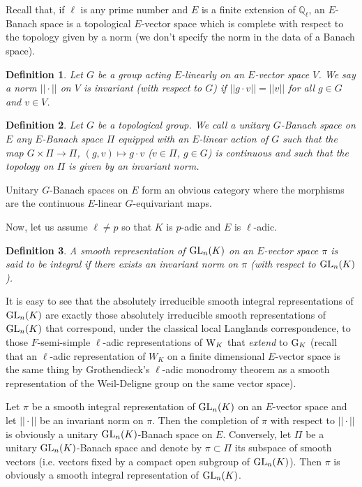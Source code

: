 \documentclass[11pt]{amsart}
\newtheorem{definit}{\bf{Definition}}[subsection]
\begin{document}
Recall that, if $\ell$ is any prime number and $E$ is a finite
extension of ${\mathbb Q}_{\ell}$, an $E$-Banach space is a
topological $E$-vector space which is complete with respect to the
topology given by a norm (we don't specify the norm in the data of a
Banach space). 
 
\begin{definit} 
Let $G$ be a group acting $E$-linearly on an $E$-vector space $V$. We
say a norm $|\!|\cdot|\!|$ on $V$ is invariant (with respect to $G$)
if $|\!|g\cdot v|\!|=|\!|v|\!|$ for all $g\in G$ and $v\in V$. 
\end{definit} 

\begin{definit} 
Let $G$ be a topological group. We call a unitary $G$-Banach space on
$E$ any $E$-Banach space $\Pi$ equipped with an $E$-linear action of
$G$ such that the map $G\times \Pi\rightarrow \Pi$, $(g,v)\mapsto g\cdot v$
($v\in\Pi$, $g\in G$) is continuous and such that the topology on $\Pi$ is
given by an invariant norm. 
\end{definit} 
 
Unitary $G$-Banach spaces on $E$ form an obvious category where the
morphisms are the continuous $E$-linear $G$-equivariant maps.
 
Now, let us assume $\ell\ne p$ so that $K$ is $p$-adic and $E$ is
$\ell$-adic. 

\begin{definit} 
A smooth representation of ${\rm GL}_n(K)$ on an $E$-vector space
$\pi$ is said to be integral if there exists an invariant norm on
$\pi$ (with respect to ${\rm GL}_n(K)$). 
\end{definit} 
 
It is easy to see that the absolutely irreducible smooth integral
representations of ${\rm GL}_n(K)$ are exactly those absolutely
irreducible smooth representations of ${\rm GL}_n(K)$ that correspond,
under the classical local Langlands correspondence, to those
$F$-semi-simple $\ell$-adic representations of ${\rm W}_K$ that {\it
  extend} to ${\rm G}_K$ (recall that an $\ell$-adic representation of
$W_K$ on a finite dimensional $E$-vector space is the same thing by
Grothendieck's $\ell$-adic monodromy theorem as a smooth
representation of the Weil-Deligne group on the same vector space).

 
Let $\pi$ be a smooth integral representation of ${\rm GL}_n(K)$ on an
$E$-vector space and let $|\!|\cdot|\!|$ be an invariant norm on
$\pi$. Then the completion of $\pi$ with respect to $|\!|\cdot|\!|$ is
obviously a unitary ${\rm GL}_n(K)$-Banach space on $E$. Conversely,
let $\Pi$ be a unitary ${\rm GL}_n(K)$-Banach space and denote by
$\pi\subset \Pi$ its subspace of smooth vectors (i.e. vectors fixed by
a compact open subgroup of ${\rm GL}_n(K)$). Then $\pi$ is obviously a
smooth integral representation of ${\rm GL}_n(K)$. 
\end{document}
